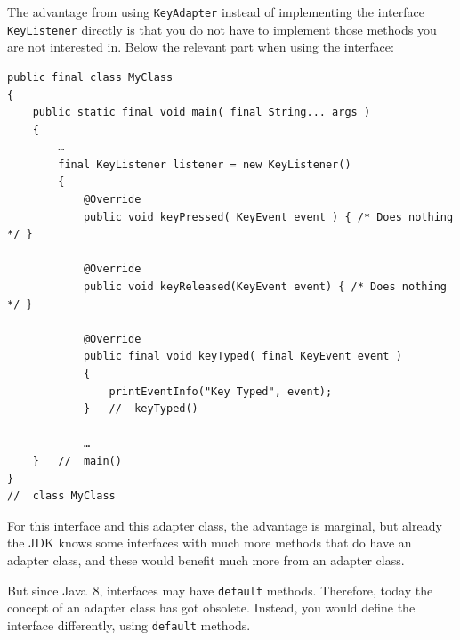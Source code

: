 \documentclass[11pt,a4paper, titlepage, parskip=half, headsepline, footsepline, cleardoublepage=current, headheight=1cm]{scrbook}
\begin{document}
The advantage from using \lstinline|KeyAdapter| instead of implementing the interface \lstinline|KeyListener| directly is that you do not have to implement those methods you are not interested in. Below the relevant part when using the interface:

\begin{lstlisting}
public final class MyClass 
{
    public static final void main( final String... args ) 
    {
        …
        final KeyListener listener = new KeyListener() 
        {
            @Override
            public void keyPressed( KeyEvent event ) { /* Does nothing */ }

            @Override
            public void keyReleased(KeyEvent event) { /* Does nothing */ }
            
            @Override
            public final void keyTyped( final KeyEvent event ) 
            {
                printEventInfo("Key Typed", event);
            }   //  keyTyped()
            
			…
    }   //  main()
}
//  class MyClass
\end{lstlisting}

For this interface and this adapter class, the advantage is marginal, but already the JDK knows some interfaces with much more methods that do have an adapter class, and these would benefit much more from an adapter class.

But since Java~8, interfaces may have \lstinline|default| methods\autocite{ORACLE_TUTORIALS:DefaultMethods, ORACLE_DOC_LANGUAGE_SPECIFICATION:MethodDeclarationsInterface}. Therefore, today the concept of an adapter class has got obsolete. Instead, you would define the interface differently, using \lstinline|default| methods.
\end{document}
